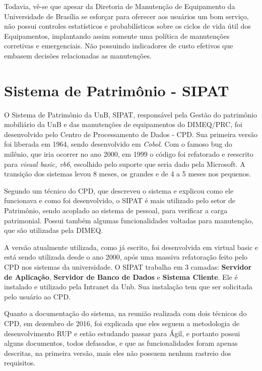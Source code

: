 Todavia, vê-se que apesar da Diretoria de Manutenção de Equipamento da Universidade de Brasília se esforçar para oferecer aos usuários um bom serviço, não possui controles estatísticos e probabilísticos sobre os ciclos de vida útil dos Equipamentos, implantando assim somente uma política de manutenções corretivas e emergenciais. Não possuindo indicadores de custo efetivos que embasem decisões relacionadas as manutenções. 


\section{Sistema de Patrimônio - SIPAT}

O Sistema de Patrimônio da UnB, SIPAT, responsável pela Gestão do patrimônio mobiliário da UnB e das manutenções de
equipamentos do DIMEQ/PRC, foi desenvolvido pelo Centro de Processamento de Dados - CPD. Sua primeira versão foi liberada em 1964, sendo desenvolvido em \textit{Cobol}. Com o famoso bug do milênio, que iria ocorrer no ano 2000, em 1999 o código foi refatorado e reescrito para \textit{visual basic, vb6}, escolhido pelo suporte que seria dado pela Microsoft. A transição dos sistemas levou 8 meses, os grandes e de 4 a 5 meses nos pequenos.

Segundo um técnico do CPD, que descreveu o sistema e explicou como ele funcionava e como foi desenvolvido, o SIPAT é mais utilizado pelo setor de Patrimônio, sendo acoplado ao sistema de pessoal, para verificar a carga patrimonial. Possui também algumas funcionalidades voltadas para manutenção, que são utilizadas pela DIMEQ.

A versão atualmente utilizada, como já escrito, foi desenvolvida em virtual basic e está sendo utilizada desde o ano 2000, após uma massiva refatoração feito pelo CPD nos sistemas da universidade. O SIPAT trabalha em 3 camadas: \textbf{Servidor de Aplicação}, \textbf{Servidor de Banco de Dados} e \textbf{Sistema Cliente}. Ele é instalado e utilizado pela Intranet da Unb. Sua instalação tem que ser solicitada pelo usuário ao CPD.

Quanto a documentação do sistema, na reunião realizada com dois técnicos do CPD, em dezembro de 2016, foi explicada que eles seguem a metodologia de desenvolvimento RUP e estão estudando passar para Ágil, e portanto possui alguns documentos, todos defasados, e que as funcionalidades foram apenas descritas, na primeira versão, mais eles não possuem nenhum rastreio dos requisitos.

